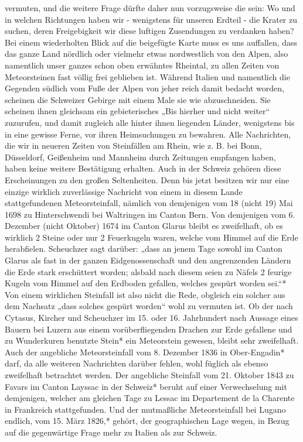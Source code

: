 \documentclass[a4paper, 8pt, oneside, polutonikogreek, german]{article}
\begin{document}
vermuten, und die weitere Frage dürfte daher nun vorzugsweise die sein: Wo und in welchen Richtungen haben wir - wenigstens für unseren Erdteil - die Krater zu suchen, deren Freigebigkeit wir diese luftigen Zusendungen zu verdanken haben? Bei einem wiederholten Blick auf die beigefügte Karte muss es uns auffallen, dass das ganze Land nördlich oder vielmehr etwas nordwestlich von den Alpen, also namentlich unser ganzes schon oben erwähntes Rheintal, zu allen Zeiten von Meteorsteinen fast völlig frei geblieben ist. Während Italien und namentlich die Gegenden südlich vom Fuße der Alpen von jeher reich damit bedacht worden, scheinen die Schweizer Gebirge mit einem Male sie wie abzuschneiden. Sie scheinen ihnen gleichsam ein gebieterisches „Bis hierher und nicht weiter“ zuzurufen, und damit zugleich alle hinter ihnen liegenden Länder, wenigstens bis in eine gewisse Ferne, vor ihren Heimsuchungen zu bewahren. Alle Nachrichten, die wir in neueren Zeiten von Steinfällen am Rhein, wie z. B. bei Bonn, Düsseldorf, Geißenheim und Mannheim durch Zeitungen empfangen haben, haben keine weitere Bestätigung erhalten. Auch in der Schweiz gehören diese Erscheinungen zu den großen Seltenheiten. Denn bis jetzt besitzen wir nur eine einzige wirklich zuverlässige Nachricht von einem in diesem Lande stattgefundenen Meteorsteinfall, nämlich von demjenigen vom 18 (nicht 19) Mai 1698 zu Hinterschwendi bei Waltringen im Canton Bern. Von demjenigen vom 6. Dezember (nicht Oktober) 1674 im Canton Glarus bleibt es zweifelhaft, ob es wirklich 2 Steine oder nur 2 Feuerkugeln waren, welche vom Himmel auf die Erde herabfielen. Scheuchzer sagt darüber: „dass an jenem Tage sowohl im Canton Glarus als fast in der ganzen Eidgenossenschaft und den angrenzenden Ländern die Erde stark erschüttert worden; alsbald nach diesem seien zu Näfels 2 feurige Kugeln vom Himmel auf den Erdboden gefallen, welches gespürt worden sei.“* Von einem wirklichen Steinfall ist also nicht die Rede, obgleich ein solcher aus dem Nachsatz „dass solches gespürt worden“ wohl zu vermuten ist. Ob der nach Cytasus, Kircher und Scheuchzer im 15. oder 16. Jahrhundert nach Aussage eines Bauern bei Luzern aus einem vorüberfliegenden Drachen zur Erde gefallene und zu Wunderkuren benutzte Stein* ein Meteorstein gewesen, bleibt sehr zweifelhaft. Auch der angebliche Meteorsteinfall vom 8. Dezember 1836 in Ober-Engadin* darf, da alle weiteren Nachrichten darüber fehlen, wohl füglich als ebenso zweifelhaft betrachtet werden. Der angebliche Steinfall vom 21. Oktober 1843 zu Favars im Canton Layssac in der Schweiz* beruht auf einer Verwechselung mit demjenigen, welcher am gleichen Tage zu Lessac im Departement de la Charente in Frankreich stattgefunden. Und der mutmaßliche Meteorsteinfall bei Lugano endlich, vom 15. März 1826,* gehört, der geographischen Lage wegen, in Bezug auf die gegenwärtige Frage mehr zu Italien als zur Schweiz.
\end{document}

